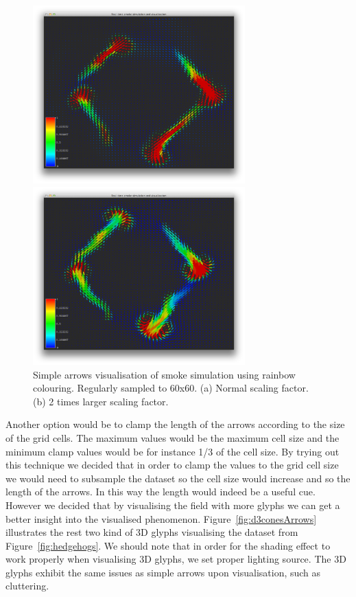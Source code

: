 \begin{figure}[htbp]
\centering
\begin{minipage}[t]{0.48\textwidth}
\includegraphics[height=2.7in]{figures/glyph/simpleArrows.png}
\end{minipage}
\begin{minipage}[t]{0.48\textwidth}
\includegraphics[height=2.7in]{figures/glyph/simpleArrowsScaled.png}
\end{minipage}
\caption{Simple arrows visualisation of smoke simulation using rainbow colouring. Regularly sampled to 60x60. (a) Normal scaling factor. (b) 2 times larger scaling factor.}
\label{fig:simpleArrowsCluttering}
\end{figure}

Another option would be to clamp the length of the arrows according to the size of the grid cells. The maximum values would be the maximum cell size and the minimum clamp values would be for instance 1/3 of the cell size. By trying out this technique we decided that in order to clamp the values to the grid cell size we would need to subsample the dataset so the cell size would increase and so the length of the arrows. In this way the length would indeed be a useful cue. However we decided that by visualising the field with more glyphs we can get a better insight into the visualised phenomenon. Figure~\ref{fig:d3conesArrows} illustrates the rest two kind of 3D glyphs visualising the dataset from Figure~\ref{fig:hedgehogs}. We should note that in order for the shading effect to work properly when visualising 3D glyphs, we set proper lighting source. The 3D glyphs exhibit the same issues as simple arrows upon visualisation, such as cluttering.


